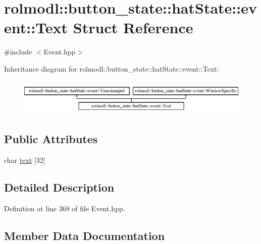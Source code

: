 \hypertarget{structrolmodl_1_1button__state_1_1hat_state_1_1event_1_1_text}{}\section{rolmodl\+::button\+\_\+state\+::hat\+State\+::event\+::Text Struct Reference}
\label{structrolmodl_1_1button__state_1_1hat_state_1_1event_1_1_text}


{\ttfamily \#include $<$Event.\+hpp$>$}

Inheritance diagram for rolmodl\+::button\+\_\+state\+::hat\+State\+::event\+::Text\+:\begin{figure}[H]
\begin{center}
\leavevmode
\includegraphics[height=1.761006cm]{structrolmodl_1_1button__state_1_1hat_state_1_1event_1_1_text}
\end{center}
\end{figure}
\subsection*{Public Attributes}
\begin{DoxyCompactItemize}
\item 
char \mbox{\hyperlink{structrolmodl_1_1button__state_1_1hat_state_1_1event_1_1_text_af661036a1b36d343201e4dec1315356a}{text}} \mbox{[}32\mbox{]}
\end{DoxyCompactItemize}


\subsection{Detailed Description}


Definition at line 368 of file Event.\+hpp.



\subsection{Member Data Documentation}
\mbox{\label{structrolmodl_1_1button__state_1_1hat_state_1_1event_1_1_text_af661036a1b36d343201e4dec1315356a}} 
